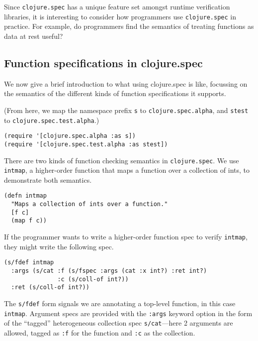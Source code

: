 \documentclass[9pt]{extarticle}
\begin{document}
Since \texttt{clojure.spec} has a unique feature set amongst runtime verification
libraries, it is interesting to consider how programmers use \texttt{clojure.spec}
in practice. For example, do programmers find the semantics of treating functions
as data at rest useful?


\subsection{Function specifications in clojure.spec}

We now give a brief introduction to what using clojure.spec is like,
focussing on the semantics of the different kinds of function specifications
it supports.

(From here, we map the namespace prefix \texttt{s} to \texttt{clojure.spec.alpha},
and \texttt{stest} to \texttt{clojure.spec.test.alpha}.)

\begin{verbatim}
(require '[clojure.spec.alpha :as s])
(require '[clojure.spec.test.alpha :as stest])
\end{verbatim}

There are two kinds of function checking semantics in \texttt{clojure.spec}.
We use \texttt{intmap}, a higher-order function that maps a function over 
a collection of ints, to demonstrate both semantics.

\begin{verbatim}
(defn intmap
  "Maps a collection of ints over a function."
  [f c]
  (map f c))
\end{verbatim}

If the programmer wants to write a higher-order function spec to
verify \texttt{intmap}, they might write the following spec.

\begin{verbatim}
(s/fdef intmap
  :args (s/cat :f (s/fspec :args (cat :x int?) :ret int?)
               :c (s/coll-of int?))
  :ret (s/coll-of int?))
\end{verbatim}

The \texttt{s/fdef} form signals we are annotating a top-level
function, in this case \texttt{intmap}. Argument specs are
provided with the \texttt{:args} keyword option
in the form of the ``tagged'' heterogeneous collection spec
\texttt{s/cat}---here 2 arguments are allowed, tagged as
\texttt{:f} for the function and \texttt{:c} as the collection.
\end{document}
